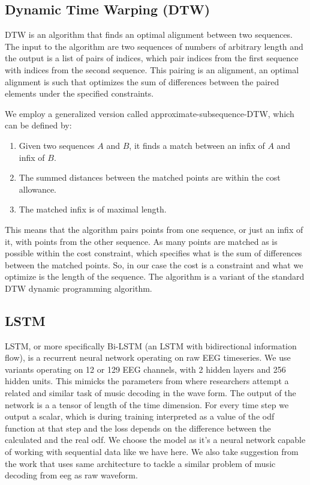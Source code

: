 \subsection{Dynamic Time Warping (DTW)}

DTW is an algorithm that finds an optimal alignment between two sequences.
The input to the algorithm are two sequences of numbers of arbitrary length and the output is a list of pairs of indices,
which pair indices from the first sequence with indices from the second sequence.
This pairing is an alignment, an optimal alignment is such that optimizes the sum of differences between the paired elements under the specified constraints.

We employ a generalized version called approximate-subsequence-DTW, which can be defined by:
\begin{enumerate}
  \item Given two sequences $A$ and $B$, it finds a match between an infix of $A$ and infix of $B$.
  \item The summed distances between the matched points are within the cost allowance.
  \item The matched infix is of maximal length.
\end{enumerate}

This means that the algorithm pairs points from one sequence, or just an infix of it, with points from the other sequence.
As many points are matched as is possible within the cost constraint, which specifies what is the sum of differences between the matched points.
So, in our case the cost is a constraint and what we optimize is the length of the sequence.
The algorithm is a variant of the standard DTW dynamic programming algorithm.

\subsection{LSTM}

LSTM, or more specifically Bi-LSTM\cite{lstm} (an LSTM with bidirectional information flow), is a recurrent neural network operating on raw EEG timeseries.
We use variants operating on 12 or 129 EEG channels, with 2 hidden layers and 256 hidden units.
This mimicks the parameters from \cite{daly} where researchers attempt a related and similar task of music decoding in the wave form.
The output of the network is a a tensor of length of the time dimension.
For every time step we output a scalar, which is during training interpreted as a value of the odf function at that step and the loss depends on the difference between the calculated and the real odf.
We choose the model as it's a neural network capable of working with sequential data like we have here. 
We also take suggestion from the work\cite{daly} that uses same architecture to tackle a similar problem of music decoding from eeg as raw waveform.


